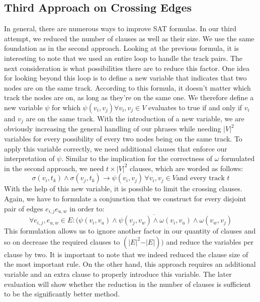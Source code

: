\documentclass[bachelor, english]{algothesis}
\begin{document}
\subsection{Third Approach on Crossing Edges}
\label{sec:approach2_2}
In general, there are numerous ways to improve SAT formulas. In our third attempt, we reduced the number of clauses as well as their size. We use the same foundation as in the second approach. Looking at the previous formula, it is interesting to note that we used an entire loop to handle the track pairs. The next consideration is what possibilities there are to reduce this factor. \newline
One idea for looking beyond this loop is to define a new variable that indicates that two nodes are on the same track. According to this formula, it doesn't matter which track the nodes are on, as long as they're on the same one. We therefore define a new variable $\psi$ for which $\psi(v_i,v_j) \forall v_i,v_j \in V$ evaluates to true if and only if $v_i$ and $v_j$ are on the same track. With the introduction of a new variable, we are obviously increasing the general handling of our phrases while needing ${\vert V \vert}^2$ variables for every possibility of every two nodes being on the same track. To apply this variable correctly, we need additional clauses that enforce our interpretation of $\psi$. Similar to the implication for the correctness of $\omega$ formulated in the second approach, we need $t \times {\vert V \vert}^2$ clauses, which are worded as follows:
    $$ \sigma(v_i,t_k) \land \sigma(v_j,t_k)\rightarrow \psi(v_i,v_j) \, \forall v_i,v_j \in V \text{and every track }t$$ 
With the help of this new variable, it is possible to limit the crossing clauses. Again, we have to formulate a conjunction that we construct for every disjoint pair of edges $e_{i,j} e_{u,w}$ in order to:
    $$ \forall e_{i,j}, e_{u,w} \in E : \overline{(\psi(v_i,v_u) \land \psi(v_j,v_w) \land   \omega(v_i,v_u) \land \omega(v_w,v_j)}$$ 
This formulation allows us to ignore another factor in our quantity of clauses and so on decrease the required clauses to $ (\vert E \vert^2 - \vert E \vert))$ and reduce the variables per clause by two. It is important to note that we indeed reduced the clause size of the most important rule. On the other hand, this approach requires an additional variable and an extra clause to properly introduce this variable. The later evaluation will show whether the reduction in the number of clauses is sufficient to be the significantly better method.
\end{document}
